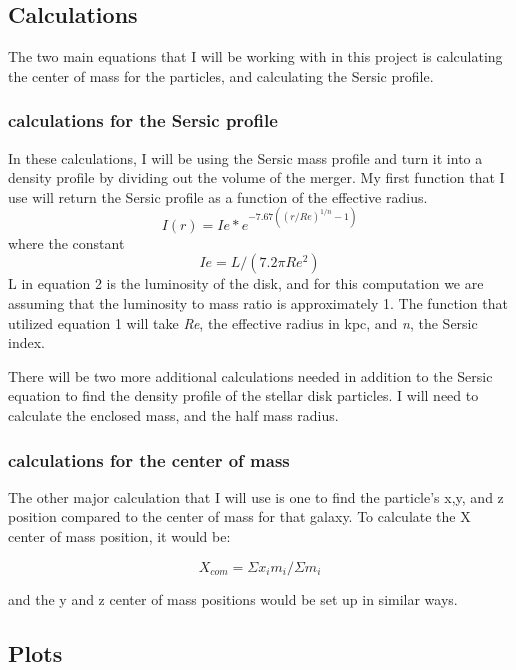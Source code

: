 \documentclass[twocolumn]{aastex63}
\begin{document}
\subsection{Calculations}
The two main equations that I will be working with in this project is calculating the center of mass for the particles, and calculating the Sersic profile. 

\subsubsection{calculations for the Sersic profile}
In these calculations, I will be using the Sersic mass profile and turn it into a density profile by dividing out the volume of the merger. My first function that I use will return the Sersic profile as a function of the effective radius.
\begin{equation}
    I(r) = Ie*e^{-7.67((r/Re)^{1/n}-1)}
\end{equation}
where the constant
\begin{equation}
    Ie = L/(7.2\pi Re^2)
\end{equation}
L in equation 2 is the luminosity of the disk, and for this computation we are assuming that the luminosity to mass ratio is approximately 1. The function that utilized equation 1 will take \textit{Re}, the effective radius in kpc, and \textit{n}, the Sersic index. 

There will be two more additional calculations needed in addition to the Sersic equation to find the density profile of the stellar disk particles. I will need to calculate the enclosed mass, and the half mass radius. 

\subsubsection{calculations for the center of mass}

The other major calculation that I will use is one to find the particle's x,y, and z position compared to the center of mass for that galaxy. To calculate the X center of mass position, it would be:

\begin{equation}
    X_{com} = \Sigma x_{i}m_{i}/ \Sigma m_{i}
\end{equation}

and the y and z center of mass positions would be set up in similar ways. 


\subsection{Plots}
\end{document}
